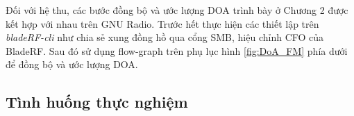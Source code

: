 
Đối với hệ thu, các bước đồng bộ và ước lượng DOA trình bày ở Chương 2 được kết hợp với nhau trên GNU Radio. Trước hết thực hiện các thiết lập trên \textit{bladeRF-cli} như chia sẻ xung đồng hồ qua cổng SMB, hiệu chỉnh CFO của BladeRF. Sau đó sử dụng flow-graph trên phụ lục hình \ref{fig:DoA_FM} phía dưới để đồng bộ và ước lượng DOA. 

\subsection{Tình huống thực nghiệm}

